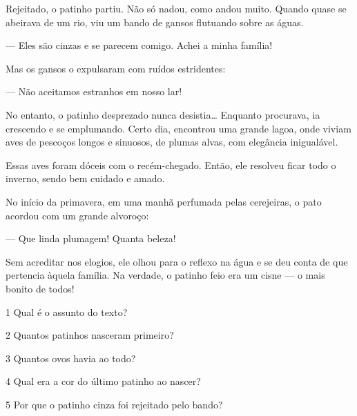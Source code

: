 \begin{myquote}
Rejeitado, o patinho partiu. Não só nadou, como andou muito. Quando
quase se abeirava de um rio, viu um bando de gansos flutuando sobre as
águas.

--- Eles são cinzas e se parecem comigo. Achei a minha família!

Mas os gansos o expulsaram com ruídos estridentes:

--- Não aceitamos estranhos em nosso lar!

No entanto, o patinho desprezado nunca desistia\ldots{} Enquanto procurava,
ia crescendo e se emplumando. Certo dia, encontrou uma grande lagoa,
onde viviam aves de pescoços longos e sinuosos, de plumas alvas, com
elegância inigualável.

Essas aves foram dóceis com o recém-chegado. Então, ele resolveu ficar
todo o inverno, sendo bem cuidado e amado.

No início da primavera, em uma manhã perfumada pelas cerejeiras, o pato
acordou com um grande alvoroço:

--- Que linda plumagem! Quanta beleza!

Sem acreditar nos elogios, ele olhou para o reflexo na água e se deu
conta de que pertencia àquela família. Na verdade, o patinho feio era um
cisne --- o mais bonito de todos!

\end{myquote}

\num{1} Qual é o assunto do texto?


\num{2} Quantos patinhos nasceram primeiro?


\num{3} Quantos ovos havia ao todo?


\num{4} Qual era a cor do último patinho ao nascer?


\num{5} Por que o patinho cinza foi rejeitado pelo bando?


